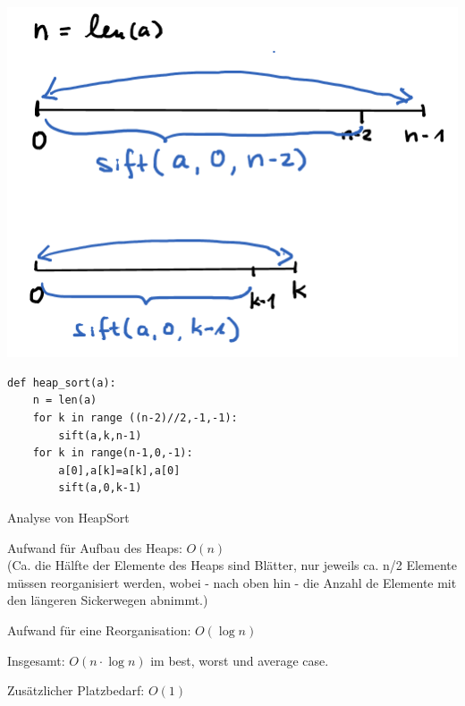 \documentclass{beamer}
\begin{document}
\begin{frame}[fragile]

\includegraphics[scale=0.5]{heap5.png} \pause

\begin{lstlisting} 
def heap_sort(a):
    n = len(a)
    for k in range ((n-2)//2,-1,-1):
        sift(a,k,n-1)
    for k in range(n-1,0,-1):
        a[0],a[k]=a[k],a[0]
        sift(a,0,k-1)
\end{lstlisting} 
\end{frame}


\begin{frame}[fragile]

Analyse von HeapSort 

Aufwand für Aufbau des Heaps: \pause $O(n)$  \\  
(Ca. die Hälfte der Elemente des Heaps sind Blätter, nur jeweils ca. n/2 Elemente müssen reorganisiert werden, 
wobei - nach oben hin - die Anzahl de  Elemente mit den längeren Sickerwegen abnimmt.)   

Aufwand für eine Reorganisation:  \pause  $O(\log n)$

Insgesamt: $O(n \cdot \log n)$ im best, worst und average case.  

Zusätzlicher Platzbedarf:  \pause  $O(1)$

\end{frame}
\end{document}
